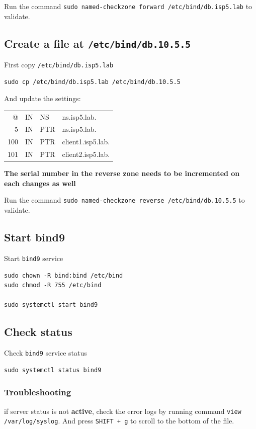 \documentclass[11pt]{article}
\begin{document}
Run the command \texttt{sudo named-checkzone forward /etc/bind/db.isp5.lab} to validate.

\subsection{Create a file at \texttt{/etc/bind/db.10.5.5}}
\label{sec:org0b9a174}

First copy \texttt{/etc/bind/db.isp5.lab}

\begin{verbatim}
sudo cp /etc/bind/db.isp5.lab /etc/bind/db.10.5.5
\end{verbatim}

And update the settings:

\begin{center}
\begin{tabular}{rlll}
@ & IN & NS & ns.isp5.lab.\\
5 & IN & PTR & ns.isp5.lab.\\
100 & IN & PTR & client1.isp5.lab.\\
101 & IN & PTR & client2.isp5.lab.\\
\end{tabular}
\end{center}

\textbf{The serial number in the reverse zone needs to be incremented on each changes as well}

Run the command \texttt{sudo named-checkzone reverse /etc/bind/db.10.5.5} to validate.

\subsection{Start bind9}
\label{sec:orgb60d7c9}

Start \texttt{bind9} service
\begin{verbatim}
sudo chown -R bind:bind /etc/bind
sudo chmod -R 755 /etc/bind

sudo systemctl start bind9
\end{verbatim}

\subsection{Check status}
\label{sec:org952ee8e}
Check \texttt{bind9} service status
\begin{verbatim}
sudo systemctl status bind9
\end{verbatim}

\subsubsection{Troubleshooting}
\label{sec:org0912d3e}
if server status is not \textbf{active}, check the error logs by running command \texttt{view /var/log/syslog}.
And press \texttt{SHIFT + g} to scroll to the bottom of the file.
\end{document}
